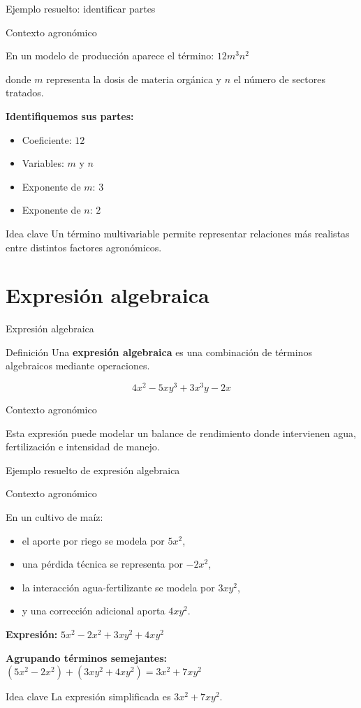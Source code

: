 \documentclass[handout,aspectratio=169,12pt]{beamer}
\newcommand{\IdeaClave}[1]{
	\begin{alertblock}{Idea clave}
		#1
	\end{alertblock}
}
\newcommand{\Agronomia}[1]{
	\begin{exampleblock}{Contexto agronómico}
		#1
	\end{exampleblock}
}
\begin{document}
	\begin{frame}{Ejemplo resuelto: identificar partes} 
		\Agronomia{
			En un modelo de producción aparece el término: \qquad $12m^3n^2$
			
			\smallskip
			
			donde \(m\) representa la dosis de materia orgánica y \(n\) el número de sectores tratados.
		}
		
		\pause
		\textbf{Identifiquemos sus partes:}
		\begin{itemize}
			\item Coeficiente: \(12\)
			\pause
			\item Variables: \(m\) y \(n\)
			\pause
			\item Exponente de \(m\): \(3\)
			\pause
			\item Exponente de \(n\): \(2\)
		\end{itemize}
		
		\pause
		\IdeaClave{Un término multivariable permite representar relaciones más realistas entre distintos factores agronómicos.}
	\end{frame}
	
	\section{Expresión algebraica}
	\begin{frame}{Expresión algebraica}
		\begin{block}{Definición}
			Una \textbf{expresión algebraica} es una combinación de términos algebraicos mediante operaciones.
		\end{block}
		
		\pause
		\[
		4x^2 - 5xy^3 + 3x^3y - 2x
		\]
		
		\pause
		\Agronomia{
			Esta expresión puede modelar un balance de rendimiento donde intervienen agua, fertilización e intensidad de manejo.
		}
	\end{frame}
	
	\begin{frame}{Ejemplo resuelto de expresión algebraica}
		\Agronomia{
			En un cultivo de maíz:
			\begin{itemize}
				\item el aporte por riego se modela por \(5x^2\),
				\pause
				\item una pérdida técnica se representa por \(-2x^2\),
				\pause
				\item la interacción agua-fertilizante se modela por \(3xy^2\),
				\pause
				\item y una corrección adicional aporta \(4xy^2\).
			\end{itemize}
		}
		
		\pause
		\textbf{Expresión:} \qquad $5x^2 - 2x^2 + 3xy^2 + 4xy^2$
		\medskip
		\pause
		
		\medskip
		
		\textbf{Agrupando términos semejantes:} \quad $(5x^2 - 2x^2) + (3xy^2 + 4xy^2)=3x^2 + 7xy^2$
		
		\pause
		\IdeaClave{La expresión simplificada es \(3x^2 + 7xy^2\).}
	\end{frame}
	
\end{document}
